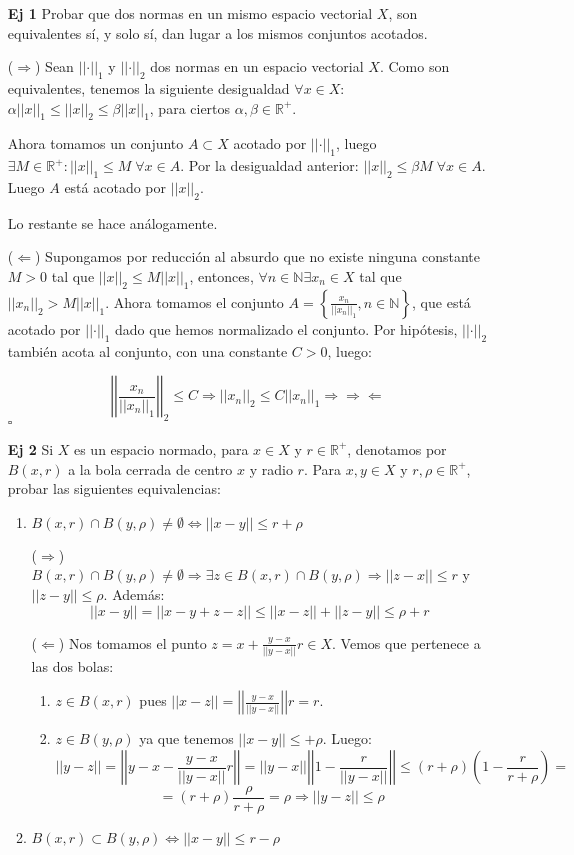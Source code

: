 \documentclass[12pt,letterpaper]{article}
\newcommand{\R}{\mathbb{R}}
\newcommand{\N}{\mathbb{N}}
\newcommand{\norm}[1]{\left|\left| #1 \right|\right|}
\newcommand{\contradiccion}{\Rightarrow\!\Leftarrow}
\newcommand{\cqd}{\hfill\ensuremath{\square}}
\begin{document}
\begin{enumerate}
  \item[\textbf{Ej 1}] 
  Probar que dos normas en un mismo espacio vectorial $X$, son equivalentes sí, y solo sí, dan lugar a los mismos conjuntos acotados. 
  
  ($\Rightarrow$)
  Sean $\norm{\cdot}_1$ y $\norm{\cdot}_2$ dos normas en un espacio vectorial $X$. Como son equivalentes, tenemos la siguiente desigualdad $\forall x \in X$: $\alpha \norm{x}_1\leq \norm{x}_2 \leq \beta \norm{x}_1$, para ciertos $\alpha, \beta \in \R^+$.
  
  Ahora tomamos un conjunto $A \subset X$ acotado por $\norm{\cdot}_1$, luego $\exists M \in \R^+: \norm{x}_1\leq M \;\forall x \in A$. Por la desigualdad anterior: $\norm{x}_2 \leq \beta M \; \forall x \in A$. Luego $A$ está acotado por $\norm{x}_2$. 
  
  Lo restante se hace análogamente.
  
  ($\Leftarrow$) Supongamos por reducción al absurdo que no existe ninguna constante $M>0$ tal que $\norm{x}_2\leq M \norm{x}_1$, entonces, $\forall n \in \N \exists x_n \in X$ tal que $\norm{x_n}_2 > M\norm{x}_1$. Ahora tomamos el conjunto $A=\left\{\frac{x_n}{\norm{x_n}_1}, n \in \N\right\}$, que está acotado por $\norm{\cdot}_1$ dado que hemos normalizado el conjunto. Por hipótesis, $\norm{\cdot}_2$ también acota al conjunto, con una constante $C>0$, luego:
  
  \[\norm{\frac{x_n}{\norm{x_n}_1}}_2 \leq C \Longrightarrow \norm{x_n}_2 \leq C \norm{x_n}_1 \Longrightarrow \contradiccion\]
  \cqd

\item[\textbf{Ej 2}] Si $X$ es un espacio normado, para $x \in X$ y $r\in\R^+$, denotamos por $B(x,r)$ a la bola cerrada de centro $x$ y radio $r$. Para $x,y\in X$ y $r,\rho\in\R^+$, probar las siguientes equivalencias:

\begin{enumerate}
	\item $B(x,r)\cap B(y,\rho) \neq \emptyset \Longleftrightarrow \norm{x-y} \leq r+\rho$
	
	($\Rightarrow$) $B(x,r)\cap B(y,\rho) \neq \emptyset \Rightarrow \exists z \in B(x,r)\cap B(y,\rho) \Rightarrow \norm{z-x} \leq r$ y $\norm{z-y} \leq \rho$. Además:
	\[\norm{x-y}=\norm{x-y+z-z}\leq\norm{x-z}+\norm{z-y}\leq \rho + r\]
	
	($\Leftarrow$) Nos tomamos el punto $z=x + \frac{y-x}{\norm{y-x}}r\in X$. Vemos que pertenece a las dos bolas:
	\begin{enumerate}
	\item $z\in B(x,r)$ pues $\norm{x-z}=\norm{\frac{y-x}{\norm{y-x}}}r=r$.
	\item $z\in B(y,\rho)$ ya que tenemos $\norm{x-y}\leq +\rho $. Luego:
	\[\norm{y-z}=\norm{y-x-\frac{y-x}{\norm{y-x}}r}=\norm{y-x}\norm{1-\frac{r}{\norm{y-x}}}\leq (r+\rho)\left(1-\frac{r}{r+\rho}\right)=\]
	\[
	=(r+\rho)\frac{\rho}{r+\rho}=\rho \Rightarrow \norm{y-z}\leq \rho
	\]
	\end{enumerate}
	\item $B(x,r) \subset B(y,\rho) \Longleftrightarrow \norm{x-y} \leq r-\rho$
	

\end{enumerate}
\end{enumerate}
\end{document}
